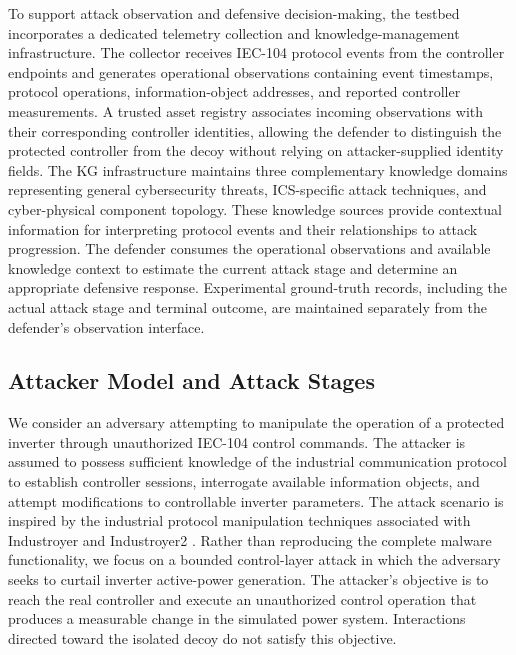 \documentclass[10pt,conference]{IEEEtran}
\begin{document}
To support attack observation and defensive decision-making, the testbed incorporates a dedicated telemetry collection and knowledge-management infrastructure. The collector receives IEC-104 protocol events from the controller endpoints and generates operational observations containing event timestamps, protocol operations, information-object addresses, and reported controller measurements. A trusted asset registry associates incoming observations with their corresponding controller identities, allowing the defender to distinguish the protected controller from the decoy without relying on attacker-supplied identity fields. The KG infrastructure maintains three complementary knowledge domains representing general cybersecurity threats, ICS-specific attack techniques, and cyber-physical component topology. These knowledge sources provide contextual information for interpreting protocol events and their relationships to attack progression. The defender consumes the operational observations and available knowledge context to estimate the current attack stage and determine an appropriate defensive response. Experimental ground-truth records, including the actual attack stage and terminal outcome, are maintained separately from the defender's observation interface.

\subsection{Attacker Model and Attack Stages}

We consider an adversary attempting to manipulate the operation of a protected inverter through unauthorized IEC-104 control commands. The attacker is assumed to possess sufficient knowledge of the industrial communication protocol to establish controller sessions, interrogate available information objects, and attempt modifications to controllable inverter parameters. The attack scenario is inspired by the industrial protocol manipulation techniques associated with Industroyer and Industroyer2 \cite{mitre2025industroyer2}. Rather than reproducing the complete malware functionality, we focus on a bounded control-layer attack in which the adversary seeks to curtail inverter active-power generation. The attacker's objective is to reach the real controller and execute an unauthorized control operation that produces a measurable change in the simulated power system. Interactions directed toward the isolated decoy do not satisfy this objective.
\end{document}
